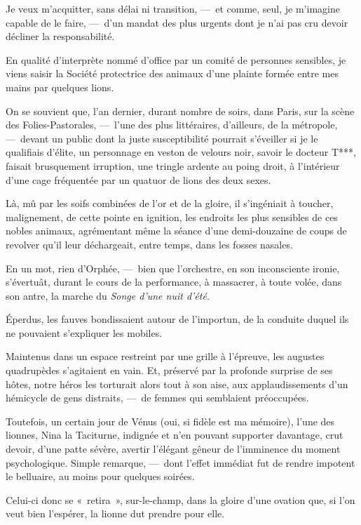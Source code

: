 \documentclass[french,twoside]{book} %
\newcommand{\bibl}[1]{{\RaggedLeft{#1}\par\bigskip}}
\begin{document}
\bibl{Proverbe arabe.}
\noindent Je veux m’acquitter, sans délai ni transition, — et comme, seul, je m’imagine capable de le faire, — d’un mandat des plus urgents dont je n’ai pas cru devoir décliner la responsabilité.\par
En qualité d’interprète nommé d’office par un comité de personnes sensibles, je viens saisir la Société protectrice des animaux d’une plainte formée entre mes mains par quelques lions.\par
On se souvient que, l’an dernier, durant nombre de soirs, dans Paris, sur la scène des Folies-Pastorales, — l’une des plus littéraires, d’ailleurs, de la métropole, — devant un public dont la juste susceptibilité pourrait s’éveiller si je le qualifiais d’élite, un personnage en veston   de velours noir, savoir le docteur T***, faisait brusquement irruption, une tringle ardente au poing droit, à l’intérieur d’une cage fréquentée par un quatuor de lions des deux sexes.\par
Là, mû par les soifs combinées de l’or et de la gloire, il s’ingéniait à toucher, malignement, de cette pointe en ignition, les endroits les plus sensibles de ces nobles animaux, agrémentant même la séance d’une demi-douzaine de coups de revolver qu’il leur déchargeait, entre temps, dans les fosses nasales.\par
En un mot, rien d’Orphée, — bien que l’orchestre, en son inconsciente ironie, s’évertuât, durant le cours de la performance, à massacrer, à toute volée, dans son antre, la marche du \emph{Songe d’une nuit d’été}.\par
Éperdus, les fauves bondissaient autour de l’importun, de la conduite duquel ils ne pouvaient s’expliquer les mobiles.\par
Maintenus dans un espace restreint par une grille à l’épreuve, les augustes quadrupèdes s’agitaient en vain. Et, préservé par la profonde   surprise de ses hôtes, notre héros les torturait alors tout à son aise, aux applaudissements d’un hémicycle de gens distraits, — de femmes qui semblaient préoccupées.\par
Toutefois, un certain jour de Vénus (oui, si fidèle est ma mémoire), l’une des lionnes, Nina la Taciturne, indignée et n’en pouvant supporter davantage, crut devoir, d’une patte sévère, avertir l’élégant gêneur de l’imminence du moment psychologique. Simple remarque, — dont l’effet immédiat fut de rendre impotent le belluaire, au moins pour quelques soirées.\par
Celui-ci donc se « retira », sur-le-champ, dans la gloire d’une ovation que, si l’on veut bien l’espérer, la lionne dut prendre pour elle.\par
\end{document}
